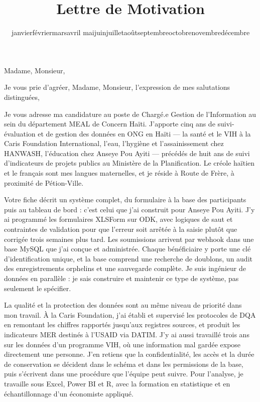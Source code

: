 \documentclass[10pt,a4paper,sans]{moderncv}
\title{Lettre de Motivation}
\renewcommand{\today}{\number\day\space\ifcase\month\or janvier\or février\or mars\or avril\or
mai\or juin\or juillet\or août\or septembre\or octobre\or novembre\or décembre\fi\space\number\year}
\begin{document}
\date{\today}
\opening{Madame, Monsieur,}
\closing{Je vous prie d'agréer, Madame, Monsieur, l'expression de mes salutations distinguées,}

\makelettertitle

Je vous adresse ma candidature au poste de Chargé.e Gestion de l'Information au sein du département MEAL de Concern Haïti. J'apporte cinq ans de suivi-évaluation et de gestion des données en ONG en Haïti --- la santé et le VIH à la Caris Foundation International, l'eau, l'hygiène et l'assainissement chez HANWASH, l'éducation chez Anseye Pou Ayiti --- précédés de huit ans de suivi d'indicateurs de projets publics au Ministère de la Planification. Le créole haïtien et le français sont mes langues maternelles, et je réside à Route de Frère, à proximité de Pétion-Ville.

Votre fiche décrit un système complet, du formulaire à la base des participants puis au tableau de bord : c'est celui que j'ai construit pour Anseye Pou Ayiti. J'y ai programmé les formulaires XLSForm sur ODK, avec logiques de saut et contraintes de validation pour que l'erreur soit arrêtée à la saisie plutôt que corrigée trois semaines plus tard. Les soumissions arrivent par webhook dans une base MySQL que j'ai conçue et administrée. Chaque bénéficiaire y porte une clé d'identification unique, et la base comprend une recherche de doublons, un audit des enregistrements orphelins et une sauvegarde complète. Je suis ingénieur de données en parallèle : je sais construire et maintenir ce type de système, pas seulement le spécifier.

La qualité et la protection des données sont au même niveau de priorité dans mon travail. À la Caris Foundation, j'ai établi et supervisé les protocoles de DQA en remontant les chiffres rapportés jusqu'aux registres sources, et produit les indicateurs MER destinés à l'USAID via DATIM. J'y ai aussi travaillé trois ans sur les données d'un programme VIH, où une information mal gardée expose directement une personne. J'en retiens que la confidentialité, les accès et la durée de conservation se décident dans le schéma et dans les permissions de la base, puis s'écrivent dans une procédure que l'équipe peut suivre. Pour l'analyse, je travaille sous Excel, Power BI et R, avec la formation en statistique et en échantillonnage d'un économiste appliqué.
\end{document}

